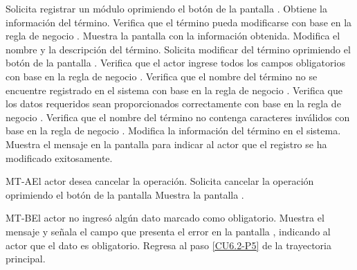 	\begin{UCtrayectoria}
		\UCpaso[\UCactor] Solicita registrar un módulo oprimiendo el botón \editar de la pantalla .
		\UCpaso[\UCsist] Obtiene la información del término.
		\UCpaso[\UCsist] Verifica que el término pueda modificarse con base en la regla de negocio . 
		\UCpaso[\UCsist] Muestra la pantalla  con la información obtenida.
		\UCpaso[\UCactor] Modifica el nombre y la descripción del término. \label{CU6.2-P5}
		\UCpaso[\UCactor] Solicita modificar del término oprimiendo el botón  de la pantalla . 
		\UCpaso[\UCsist] Verifica que el actor ingrese todos los campos obligatorios con base en la regla de negocio . 
		\UCpaso[\UCsist] Verifica que el nombre del término no se encuentre registrado en el sistema con base en la regla de negocio . 
		\UCpaso[\UCsist] Verifica que los datos requeridos sean proporcionados correctamente con base en la regla de negocio .  
		\UCpaso[\UCsist] Verifica que el nombre del término no contenga caracteres inválidos con base en la regla de negocio . 
		\UCpaso[\UCsist] Modifica la información del término en el sistema.
		\UCpaso[\UCsist] Muestra el mensaje  en la pantalla  para indicar al actor que el registro se ha modificado exitosamente.
	\end{UCtrayectoria}		
	
	\begin{UCtrayectoriaA}{MT-A}{El actor desea cancelar la operación.}
		\UCpaso[\UCactor] Solicita cancelar la operación oprimiendo el botón  de la pantalla 
		\UCpaso[\UCsist] Muestra la pantalla .
	\end{UCtrayectoriaA}

	\begin{UCtrayectoriaA}{MT-B}{El actor no ingresó algún dato marcado como obligatorio.}
		\UCpaso[\UCsist] Muestra el mensaje  y señala el campo que presenta el error en la pantalla , indicando al actor que el dato es obligatorio.
		\UCpaso Regresa al paso \ref{CU6.2-P5} de la trayectoria principal.
	\end{UCtrayectoriaA}
	
